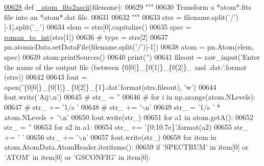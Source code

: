 \begin{DoxyCode}
\hypertarget{namespacepyneb_1_1utils_1_1manage__atomic__data_l00628}{}\hyperlink{namespacepyneb_1_1utils_1_1manage__atomic__data_a3e35c0ac9cfe657a18cb4a1a797edf32}{00628} \textcolor{keyword}{def }\hyperlink{namespacepyneb_1_1utils_1_1manage__atomic__data_a3e35c0ac9cfe657a18cb4a1a797edf32}{\_atom\_fits2ascii}(filename):
00629     \textcolor{stringliteral}{"""}
00630 \textcolor{stringliteral}{    Transform a *atom*.fits file into an *atom*.dat file.}
00631 \textcolor{stringliteral}{    }
00632 \textcolor{stringliteral}{    """}
00633     strs = filename.split(\textcolor{stringliteral}{'/'})[-1].split(\textcolor{stringliteral}{'\_'})
00634     elem = strs[0].capitalize()
00635     spec = \hyperlink{namespacepyneb_1_1utils_1_1misc_a97329c3ce57bd870421672b90e3e6541}{roman\_to\_int}(strs[1])
00636 \textcolor{comment}{#    type = strs[2]}
00637     pn.atomicData.setDataFile(filename.split(\textcolor{stringliteral}{'/'})[-1])
00638     atom = pn.Atom(elem, spec)
00639     atom.printSources()
00640     print(\textcolor{stringliteral}{''})
00641     fileout = raw\_input(\textcolor{stringliteral}{'Enter the name of the output file (between \{0[0]\}\_\{0[1]\}\_\{0[2]\}\_ and .dat:'}.format
      (strs))
00642     
00643     fout = open(\textcolor{stringliteral}{'\{0[0]\}\_\{0[1]\}\_\{0[2]\}\_\{1\}.dat'}.format(strs,fileout), \textcolor{stringliteral}{'w'})
00644     fout.write(\textcolor{stringliteral}{'Aij\(\backslash\)n'})
00645 \textcolor{comment}{#    str\_ = ''}
00646 \textcolor{comment}{#    for i in np.arange(atom.NLevels):}
00647 \textcolor{comment}{#        str\_ += '1/s '}
00648 \textcolor{comment}{#    str\_ += '\(\backslash\)n'}
00649     str\_ = \textcolor{stringliteral}{'1/s '} * atom.NLevels + \textcolor{stringliteral}{'\(\backslash\)n'}
00650     fout.write(str\_)
00651     \textcolor{keywordflow}{for} a1 \textcolor{keywordflow}{in} atom.getA():
00652         str\_ = \textcolor{stringliteral}{''}
00653         \textcolor{keywordflow}{for} a2 \textcolor{keywordflow}{in} a1:
00654             str\_ += \textcolor{stringliteral}{'\{0:10.7e\}'}.format(a2)
00655             str\_ += \textcolor{stringliteral}{' '}
00656         str\_ += \textcolor{stringliteral}{'\(\backslash\)n'}
00657         fout.write(str\_)
00658     \textcolor{keywordflow}{for} item \textcolor{keywordflow}{in} atom.AtomData.AtomHeader.iteritems():
00659         \textcolor{keywordflow}{if} \textcolor{stringliteral}{'SPECTRUM'} \textcolor{keywordflow}{in} item[0] \textcolor{keywordflow}{or} \textcolor{stringliteral}{'ATOM'} \textcolor{keywordflow}{in} item[0] \textcolor{keywordflow}{or} \textcolor{stringliteral}{'GSCONFIG'} \textcolor{keywordflow}{in} item[0]:

\end{DoxyCode}
